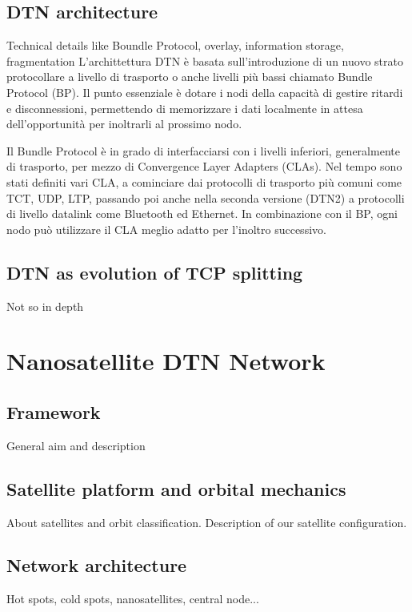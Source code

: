 \documentclass[a4paper]{article}
\begin{document}
		
		\subsection{DTN architecture}
		{\sc Technical details like Boundle Protocol, overlay, information storage, fragmentation}
		L'archittettura DTN è basata sull'introduzione di un nuovo strato protocollare a livello di trasporto o anche livelli più bassi chiamato Bundle Protocol (BP). Il punto essenziale è dotare i nodi della capacità di gestire ritardi e disconnessioni, permettendo di memorizzare i dati localmente in attesa dell'opportunità per inoltrarli al prossimo nodo. 
		
		Il Bundle Protocol è in grado di interfacciarsi con i livelli inferiori, generalmente di trasporto, per mezzo di Convergence Layer Adapters (CLAs). Nel tempo sono stati definiti vari CLA, a cominciare dai protocolli di trasporto più comuni come TCT, UDP, LTP, passando poi anche nella seconda versione (DTN2) a protocolli di livello datalink come Bluetooth ed Ethernet. 
		In combinazione con il BP, ogni nodo può utilizzare il CLA meglio adatto per l'inoltro successivo.
		
		
		\subsection{DTN as evolution of TCP splitting}
		{\sc Not so in depth}
		
	
	\section{Nanosatellite DTN Network}
		
		\subsection{Framework}
		{\sc General aim and description}
		
		\subsection{Satellite platform and orbital mechanics}
		{\sc About satellites and orbit classification.
		Description of our satellite configuration.}
		
		\subsection{Network architecture}	
		{\sc Hot spots, cold spots, nanosatellites, central node...}
		
\end{document}
